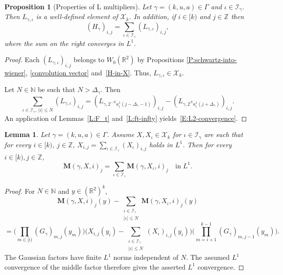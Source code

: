 \documentclass[12pt,reqno]{amsart}
\theoremstyle{plain}
\newtheorem{lemma}[theorem]{Lemma}
\newtheorem{proposition}[theorem]{Proposition}
\numberwithin{equation}{section}
\theoremstyle{remark}
\newcommand{\uses}[1]{}
\newcommand{\usesdefs}[1]{}
\newcommand{\Z}{{\mathbb Z}}
\newcommand{\R}{{\mathbb R}}
\newcommand{\N}{{\mathbb N}}
\begin{document}
\begin{proposition}[Properties of L multipliers]\label{sum L multiplier convergence-L1}\uses{P:schwartz-into-wiener,convolution vector,H-in-X,L:F_t,L:ft-infty}\usesdefs{auto:Wiener-space-definition,geometric parameters,double sequence of 2D functions,H multiplier,auto:L-kernel-definition,L multiplier,summation-definition}
Let $\gamma=(k,u,a)\in \Gamma$ and $\iota \in\mathcal{I}_{\gamma}$. Then
 $L_{\gamma,\iota}$ is a well-defined element of $\mathcal{X}_k$. In addition, if $i
\in [k)$ and $j\in \Z$ then
\begin{equation}\label{E:L2-convergence}
(H_{\gamma})_{i,j} = \sum_{\iota \in\mathcal{I}_{\gamma}} (L_{\gamma,\iota})_{i,j},
\end{equation}
where the sum on the right converges in $L^1$.
\end{proposition}

\begin{proof}
Each
$(L_{\gamma,\iota})_{i,j}$ belongs to $W_0(\R^2)$ by Propositions \ref{P:schwartz-into-wiener}, \ref{convolution vector} and~\ref{H-in-X}. Thus, $L_{\gamma,\iota}\in \mathcal{X}_k$.

Let $N\in \N$ be such that $N>\Delta_\gamma$. Then
\[
\sum_{\iota \in\mathcal{I}_{\gamma}, ~|\iota| \leq N} (L_{\gamma,\iota})_{i,j}
=(L_{\gamma,2^{-N} a_i^1(j-\Delta_\gamma-1)})_{i,j}-(L_{\gamma,2^{N} a_i^1(j+\Delta_\gamma)})_{i,j}.
\]
An application of Lemmas~\ref{L:F_t} and~\ref{L:ft-infty} yields~\eqref{E:L2-convergence}.
\end{proof}

\begin{lemma}\label{sandwich sums L1}\uses{}\usesdefs{geometric parameters,double sequence of 2D functions,2D Gaussians,sandwich kernel,L multiplier,summation-definition}
Let $\gamma=(k,u,a)\in \Gamma$.
Assume $X, X_\iota\in \mathcal{X}_k$ for $\iota\in \mathcal{I}_{\gamma}$ are such that for every $i\in [k)$, $j\in\Z$, $X_{i,j}=\sum_{\iota\in \mathcal{I}_{\gamma}} (X_\iota)_{i,j}$ holds in $L^1$.
Then for every $i\in [k), j\in\Z$,
\begin{equation}\label{auto:H-kernel-L-decomposition} \mathbf{M}(\gamma,X,i)_j = \sum_{\iota\in \mathcal{I}_{\gamma}} \mathbf{M}(\gamma,X_\iota,i)_j\quad\text{in}\;L^1.\end{equation}
\end{lemma}

\begin{proof}
For $N\in\N$ and $y\in(\R^2)^k$,
\[
\mathbf M(\gamma,X,i)_j(y)-
\sum_{\substack{\iota\in\mathcal I_\gamma\\|\iota|\le N}}
\mathbf M(\gamma,X_\iota,i)_j(y)
\]
\[
=
\Big(\prod_{m\in[i)}(G_\gamma)_{m,j}(y_m)\Big)
\Big(X_{i,j}(y_i)-
\sum_{\substack{\iota\in\mathcal I_\gamma\\|\iota|\le N}}
(X_\iota)_{i,j}(y_i)\Big)
\Big(\prod_{m=i+1}^{k-1}(G_\gamma)_{m,j-1}(y_m)\Big).
\]
The Gaussian factors have finite $L^1$ norms independent of $N$. The assumed $L^1$ convergence of the middle factor therefore gives the asserted $L^1$ convergence.
\end{proof}
\end{document}

